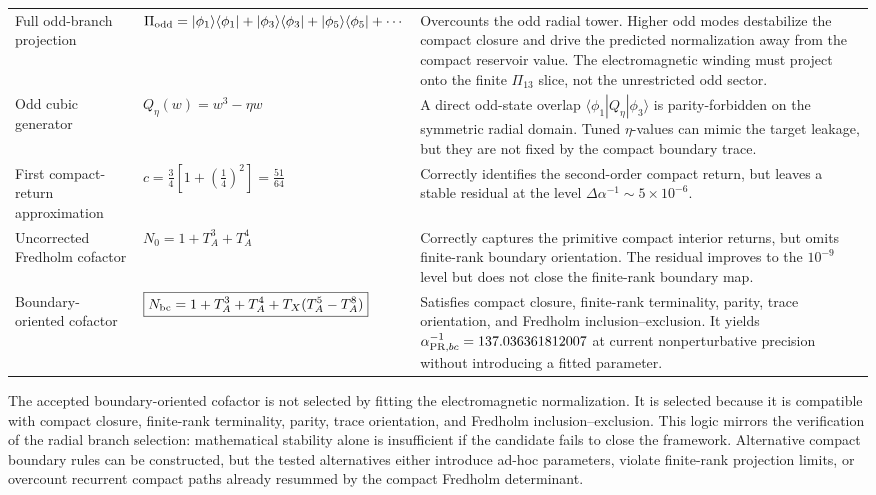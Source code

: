 \documentclass[11pt]{article}
\begin{document}
\begin{table}[h]
\begin{tabular}{p{}p{}p{}}
Full odd-branch projection
&
\(\Pi_{\rm odd}=|\phi_1\rangle\langle\phi_1|
+|\phi_3\rangle\langle\phi_3|
+|\phi_5\rangle\langle\phi_5|+\cdots\)
&
Overcounts the odd radial tower. Higher odd modes destabilize the compact
closure and drive the predicted normalization away from the compact reservoir
value. The electromagnetic winding must project onto the finite \(\Pi_{13}\)
slice, not the unrestricted odd sector.
\\

Odd cubic generator
&
\(Q_\eta(w)=w^3-\eta w\)
&
A direct odd-state overlap \(\langle\phi_1|Q_\eta|\phi_3\rangle\) is
parity-forbidden on the symmetric radial domain. Tuned \(\eta\)-values can mimic
the target leakage, but they are not fixed by the compact boundary trace.
\\

First compact-return approximation
&
\(c=\frac34\left[1+\left(\frac14\right)^2\right]=\frac{51}{64}\)
&
Correctly identifies the second-order compact return, but leaves a stable
residual at the level \(\Delta\alpha^{-1}\sim5\times10^{-6}\).
\\

Uncorrected Fredholm cofactor
&
\(N_0=1+T_A^3+T_A^4\)
&
Correctly captures the primitive compact interior returns, but omits finite-rank
boundary orientation. The residual improves to the \(10^{-9}\) level but does
not close the finite-rank boundary map.
\\

Boundary-oriented cofactor
&
\(\boxed{N_{\rm bc}=1+T_A^3+T_A^4+T_X(T_A^5-T_A^8)}\)
&
Satisfies compact closure, finite-rank terminality, parity, trace orientation,
and Fredholm inclusion--exclusion. It yields
\(\alpha_{{\rm PR},bc}^{-1}=137.036361812007\) at current nonperturbative
precision without introducing a fitted parameter.
\\

\hline
\end{tabular}
\label{tab:compact_boundary_failure_modes}
\end{table}

The accepted boundary-oriented cofactor is not selected by fitting the
electromagnetic normalization. It is selected because it is compatible with
compact closure, finite-rank terminality, parity, trace orientation, and
Fredholm inclusion--exclusion. This logic mirrors the verification of the radial
branch selection: mathematical stability alone is insufficient if the candidate
fails to close the framework. Alternative compact boundary rules can be
constructed, but the tested alternatives either introduce ad-hoc parameters,
violate finite-rank projection limits, or overcount recurrent compact paths
already resummed by the compact Fredholm determinant.
\end{document}
